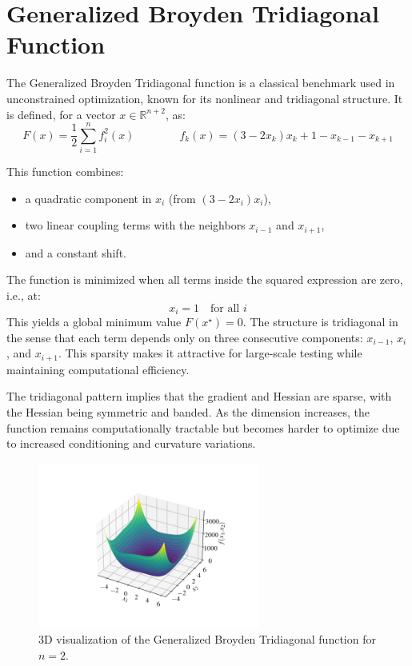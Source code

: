 \documentclass[a4paper,12pt]{article}
\begin{document}
	\section{Generalized Broyden Tridiagonal Function}
	
	The Generalized Broyden Tridiagonal function is a classical benchmark used in unconstrained optimization, known for its nonlinear and tridiagonal structure. It is defined, for a vector \( x \in \mathbb{R}^{n+2} \), as:
	\begin{equation}
		F(x) = \frac{1}{2} \sum_{i=1}^{n} f_i^2(x)
		\qquad\qquad
		f_k(x) = (3 - 2x_k)x_k + 1 - x_{k-1} - x_{k+1}
	\end{equation}
	
	This function combines:
	\begin{itemize}[nosep]
		\item a quadratic component in \( x_i \) (from \( (3 - 2x_i)x_i \)),
		\item two linear coupling terms with the neighbors \( x_{i-1} \) and \( x_{i+1} \),
		\item and a constant shift.
	\end{itemize}
	
	The function is minimized when all terms inside the squared expression are zero, i.e., at:
	\[
	x_i = 1 \quad \text{for all } i
	\]
	This yields a global minimum value \( F(x^\star) = 0 \). The structure is tridiagonal in the sense that each term depends only on three consecutive components: \( x_{i-1} \), \( x_i \), and \( x_{i+1} \). This sparsity makes it attractive for large-scale testing while maintaining computational efficiency.
	
	The tridiagonal pattern implies that the gradient and Hessian are sparse, with the Hessian being symmetric and banded. As the dimension increases, the function remains computationally tractable but becomes harder to optimize due to increased conditioning and curvature variations.
	
	\begin{figure}[htbp]
		\centering
		\includegraphics[width=0.65\textwidth]{../immagini/broyden.png}
		\caption{3D visualization of the Generalized Broyden Tridiagonal function for $n=2$.}
		\label{fig:broyden3D}
	\end{figure}
	
\end{document}
